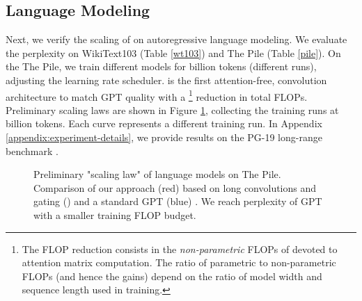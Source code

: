 \subsection{Language Modeling}\label{res:lm}
Next, we verify the scaling of  on autoregressive language modeling. We evaluate the perplexity on {\sc WikiText103} (Table \ref{wt103}) and {\sc The Pile} (Table \ref{pile}). On the {\sc The Pile}, we train different models for  billion tokens (different runs), adjusting the learning rate scheduler.  is the first attention-free, convolution architecture to match GPT quality with a \footnote{The FLOP reduction consists in the \textit{non-parametric} FLOPs of {} devoted to attention matrix computation. The ratio of parametric to non-parametric FLOPs (and hence the gains) depend on the ratio of model width  and sequence length  used in training.} reduction in total FLOPs. Preliminary scaling laws are shown in Figure \ref{fig:hyena_laws}, collecting the training runs at  billion tokens. Each curve represents a different training run.
In Appendix \ref{appendix:experiment-details}, we provide results on the PG-19 long-range benchmark \citep{raecompressive2019}.



\begin{figure}[t]
    \centering
     \vspace{-4mm}
    \caption{Preliminary "scaling law" of language models on {\sc The Pile}. Comparison of our approach (red) based on long convolutions and gating () and a standard GPT (blue) \citep{brown2020language}. We reach perplexity of GPT with a smaller training FLOP budget.}
    \label{fig:hyena_laws}
\end{figure}



